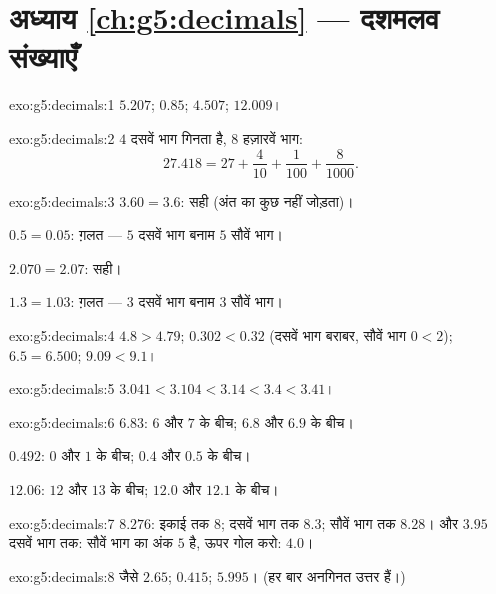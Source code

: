 \section*{अध्याय \ref{ch:g5:decimals} --- दशमलव संख्याएँ}

\begin{solution}{exo:g5:decimals:1}
$5.207$; \quad $0.85$; \quad $4.507$; \quad $12.009$।
\end{solution}

\begin{solution}{exo:g5:decimals:2}
$4$ दसवें भाग गिनता है, $8$ हज़ारवें भाग:
\[
27.418 = 27 + \frac{4}{10} + \frac{1}{100} + \frac{8}{1000}.
\]
\end{solution}

\begin{solution}{exo:g5:decimals:3}
$3.60 = 3.6$: सही (अंत का  कुछ नहीं जोड़ता)।

$0.5 = 0.05$: ग़लत --- $5$ दसवें भाग बनाम $5$ सौवें भाग।

$2.070 = 2.07$: सही।

$1.3 = 1.03$: ग़लत --- $3$ दसवें भाग बनाम $3$ सौवें भाग।
\end{solution}

\begin{solution}{exo:g5:decimals:4}
$4.8 > 4.79$; \quad $0.302 < 0.32$ (दसवें भाग बराबर, सौवें भाग
$0 < 2$); \quad $6.5 = 6.500$; \quad $9.09 < 9.1$।
\end{solution}

\begin{solution}{exo:g5:decimals:5}
$3.041 < 3.104 < 3.14 < 3.4 < 3.41$।
\end{solution}

\begin{solution}{exo:g5:decimals:6}
$6.83$: $6$ और $7$ के बीच; $6.8$ और $6.9$ के बीच।

$0.492$: $0$ और $1$ के बीच; $0.4$ और $0.5$ के बीच।

$12.06$: $12$ और $13$ के बीच; $12.0$ और $12.1$ के बीच।
\end{solution}

\begin{solution}{exo:g5:decimals:7}
$8.276$: इकाई तक $8$; दसवें भाग तक $8.3$; सौवें भाग तक
$8.28$। और $3.95$ दसवें भाग तक: सौवें भाग का अंक $5$ है, ऊपर
गोल करो: $4.0$।
\end{solution}

\begin{solution}{exo:g5:decimals:8}
जैसे $2.65$; \quad $0.415$; \quad $5.995$। (हर बार अनगिनत
उत्तर हैं।)
\end{solution}

